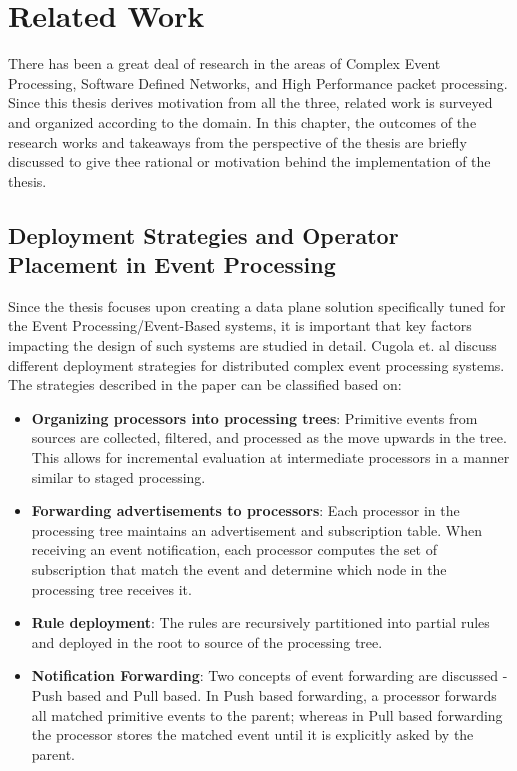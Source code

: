 \chapter{Related Work}
There has been a great deal of research in the areas of Complex Event Processing, Software Defined Networks, and High Performance packet processing. Since this thesis derives motivation from all the three, related work is surveyed and organized according to the domain. In this chapter, the outcomes of the research works and takeaways from the perspective of the thesis are briefly discussed to give thee rational or motivation behind the implementation of the thesis.

\section{Deployment Strategies and Operator Placement in Event Processing}
Since the thesis focuses upon creating a data plane solution specifically tuned for the Event Processing/Event-Based systems, it is important that key factors impacting the design of such systems are studied in detail.
Cugola et. al \cite{Cugola} discuss different deployment strategies for distributed complex event processing systems. The strategies described in the paper can be classified based on:
\begin{itemize}
	\item \textbf{Organizing processors into processing trees}: Primitive events from sources are collected, filtered, and processed as the move upwards in the tree. This allows for incremental evaluation at intermediate processors in a manner similar to staged processing. 
	\item \textbf{Forwarding advertisements to processors}: Each processor in the processing tree maintains an advertisement and subscription table.  When receiving an event notification, each processor computes the set of subscription that match the event and determine which node in the processing tree receives it. 
	\item \textbf{Rule deployment}: The rules are recursively partitioned into partial rules and deployed in the root to source of the processing tree. 
	\item \textbf{Notification Forwarding}: Two concepts of event forwarding are discussed - Push based and Pull based. In Push based forwarding, a processor forwards all matched primitive events to the parent; whereas in Pull based forwarding the processor stores the matched event until it is explicitly asked by the parent. 
\end{itemize}
